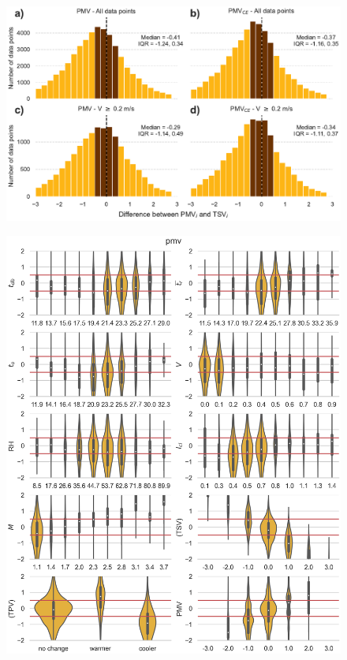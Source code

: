 \begin{figure}
    \centering
    \includegraphics[width=\textwidth]{figures/hist_discrepancies}
    \caption{}
    \label{fig:hist_discrepancies}
\end{figure}

\begin{figure}
    \centering
    \includegraphics[width=\textwidth]{figures/bias_pmv}
    \caption{}
    \label{fig:bias_pmv}
\end{figure}

